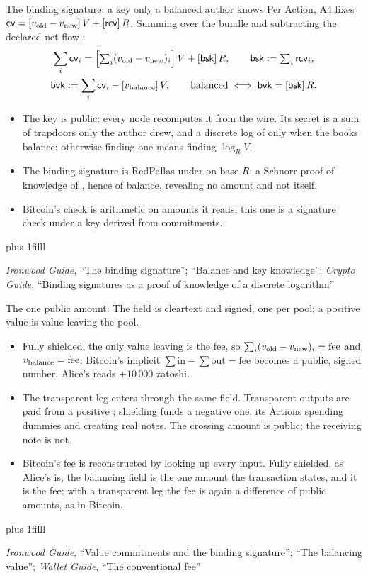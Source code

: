 \documentclass[aspectratio=169,11pt]{beamer}
\newcommand{\cvsym}{\ensuremath{\mathsf{cv}}}
\newcommand{\rcv}{\ensuremath{\mathsf{rcv}}}
\newcommand{\src}[1]{\par\vskip0pt plus 1filll
  {\fontsize{6}{7.2}\selectfont\color{arbdim}\raggedright #1\par}}
\begin{document}
\begin{frame}{The binding signature: a key only a balanced author knows}
\setlength{\abovedisplayskip}{4pt}\setlength{\belowdisplayskip}{4pt}
Per Action, A4 fixes $\cvsym = [\Epvold - \Epvnew]\,V + [\rcv]\,R$.
Summing over the bundle and subtracting the declared net flow \Epvbal:
\begin{gather*}
\sum_i \cvsym_i
= \Bigl[\textstyle\sum_i (\Epvold - \Epvnew)_i\Bigr]\,V + [\Epbsk]\,R,
\qquad \Epbsk := \sum_i \rcv_i, \\
\Epbvk := \sum_i \cvsym_i - [\Epvbal]\,V, \qquad
\text{balanced} \iff \Epbvk = [\Epbsk]\,R .
\end{gather*}
\begin{itemize}
\item The key \Epbvk{} is public: every node recomputes it from the
  wire. Its secret \Epbsk{} is a sum of trapdoors only the author drew,
  and a discrete log of \Epbvk{} only when the books balance; otherwise
  finding one means finding $\log_R V$.
\item The binding signature is RedPallas under \Epbvk{} on base $R$:
  a Schnorr proof of knowledge of \Epbsk, hence of balance, revealing
  no amount and not \Epbsk{} itself.
\item Bitcoin's check is arithmetic on amounts it reads; this one is
  a signature check under a key derived from commitments.
\end{itemize}
\src{\emph{Ironwood Guide}, ``The binding signature''; ``Balance and key
knowledge''; \emph{Crypto Guide}, ``Binding signatures as a proof of knowledge
of a discrete logarithm''}
\end{frame}

\begin{frame}{The one public amount: \Epvbal}
The field \Epvbal{} is cleartext and signed, one per pool; a positive
value is value leaving the pool.
\begin{itemize}
\item Fully shielded, the only value leaving is the fee, so
  $\sum_i (v_{\mathrm{old}} - v_{\mathrm{new}})_i = \mathrm{fee}$ and $v_{\mathrm{balance}} =
  \mathrm{fee}$: Bitcoin's implicit $\sum \mathrm{in} - \sum
  \mathrm{out} = \mathrm{fee}$ becomes a public, signed number.
  Alice's reads $+10\,000$ zatoshi.
\item The transparent leg enters through the same field. Transparent
  outputs are paid from a positive \Epvbal; shielding funds a negative
  one, its Actions spending dummies and creating real notes. The
  crossing amount is public; the receiving note is not.
\item Bitcoin's fee is reconstructed by looking up every input. Fully
  shielded, as Alice's is, the balancing field is the one amount the
  transaction states, and it is the fee; with a transparent leg the fee
  is again a difference of public amounts, as in Bitcoin.
\end{itemize}
\src{\emph{Ironwood Guide}, ``Value commitments and the binding signature'';
  ``The balancing value''; \emph{Wallet Guide}, ``The conventional fee''}
\end{frame}
\end{document}

